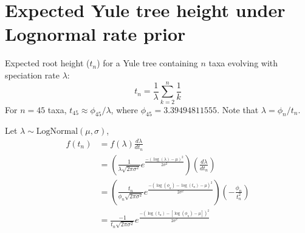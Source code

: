 \documentclass[12pt]{article}
\begin{document}
\section{Expected Yule tree height under Lognormal rate prior}

Expected root height ($t_n$) for a Yule tree containing $n$ taxa evolving with speciation rate $\lambda$:
\[ t_n = \frac{1}{\lambda} \sum_{k=2}^n \frac{1}{k} \]
For $n=45$ taxa, $t_{45} \approx \phi_{45}/\lambda$, where $\phi_{45} = 3.39494811555$. Note that $\lambda = \phi_n/t_n$.

Let $\lambda \sim \mbox{LogNormal}(\mu,\sigma)$,
\begin{align*}
f(t_n) &= f(\lambda) \frac{d\lambda}{dt_n} \\
&= \left(\frac{1}{\lambda \sqrt{2 \pi \sigma^2}} e^{\frac{-(\log(\lambda) - \mu)^2}{2\sigma^2}} \right) \left( \frac{d\lambda}{dt_n} \right) \\
&= \left(\frac{t_n}{\phi_n \sqrt{2 \pi \sigma^2}} e^{\frac{-(\log(\phi_n) - \log(t_n) - \mu)^2}{2\sigma^2}} \right) \left( -\frac{\phi_n}{t_n^2} \right) \\
&= \frac{-1}{t_n \sqrt{2 \pi \sigma^2}} e^{\frac{-(\log(t_n) - [\log(\phi_n) - \mu])^2}{2\sigma^2}}  
\end{align*}
\end{document}
